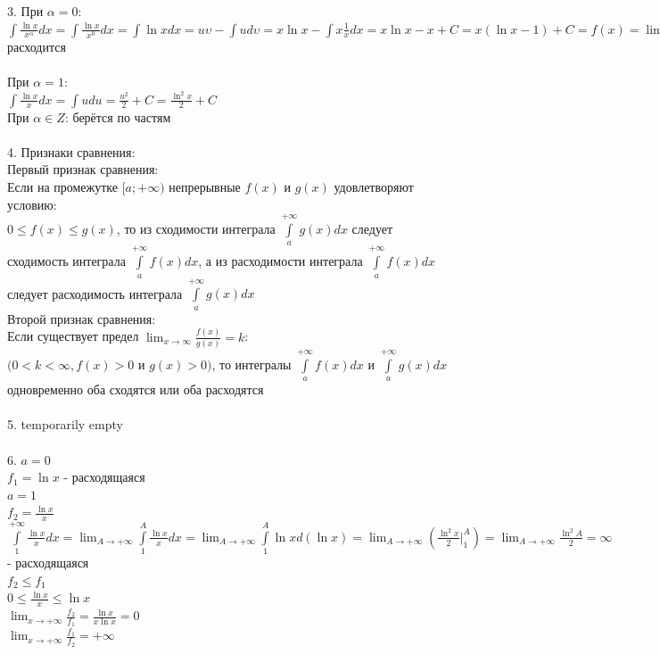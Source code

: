 \documentclass{article}
\begin{document}
3. При $ \alpha = 0 $:\\
\large
$ \int\limits \frac{\ln{x}}{x^{\alpha}}dx = \int\limits \frac{\ln{x}}{x^0}dx = \int\limits \ln{x}dx = u\upsilon - \int\limits ud\upsilon = x\ln{x} - \int\limits x\frac{1}{x}dx = x\ln{x} - x + C = x(\ln{x} - 1) + C = f(x) = \lim_{x\to \infty} f(x) = \infty => $ расходится\\\\
\normalsize
При $ \alpha = 1 $:\\
\large
$ \int\limits \frac{\ln{x}}{x}dx = \int\limits udu = \frac{u^2}{2} + C = \frac{\ln^2{x}}{2} + C $\\
\normalsize
При $ \alpha \in Z $: берётся по частям\\\\
4. Признаки сравнения:\\
Первый признак сравнения:\\
Если на промежутке $ [a; +\infty) $ непрерывные $ f(x) $ и $ g(x) $ удовлетворяют условию:\\
$ 0 \le f(x) \le g(x) $, то из сходимости интеграла $ \int\limits^{+\infty}_{a} g(x)dx $ следует сходимость интеграла $ \int\limits^{+\infty}_{a} f(x)dx $, а из расходимости интеграла $ \int\limits^{+\infty}_{a} f(x)dx $ следует расходимость интеграла $ \int\limits^{+\infty}_{a} g(x)dx $\\
Второй признак сравнения:\\
Если существует предел $ \lim_{x\to \infty} \frac{f(x)}{g(x)} = k $:\\
$ (0 < k < \infty, f(x) > 0 $ и $ g(x) > 0) $, то интегралы $ \int\limits^{+\infty}_{a} f(x)dx $ и $ \int\limits^{+\infty}_{a} g(x)dx $ одновременно оба сходятся или оба расходятся\\\\
5. temporarily empty\\\\
6. $ a = 0 $\\
$ f_1 = \ln{x} $ - расходящаяся\\
$ a = 1 $\\
$ f_2 = \frac{\ln{x}}{x} $\\
$ \int\limits^{+\infty}_1 \frac{\ln{x}}{x}dx = \lim_{A\to +\infty} \int\limits^A_1 \frac{\ln{x}}{x}dx = \lim_{A\to +\infty} \int\limits^A_1 \ln{x}d(\ln{x}) = \lim_{A\to +\infty} (\frac{\ln^2{x}}{2} |^A_1) = \lim_{A\to +\infty} \frac{\ln^2{A}}{2} = \infty $ - расходящаяся\\
$ f_2 \le f_1 $\\
$ 0 \le \frac{\ln{x}}{x} \le \ln{x} $\\
$ \lim_{x\to +\infty} \frac{f_2}{f_1} = \frac{\ln{x}}{x\ln{x}} = 0 $\\
$ \lim_{x\to +\infty} \frac{f_1}{f_2} = +\infty $
\newpage
\Large
\end{document}
